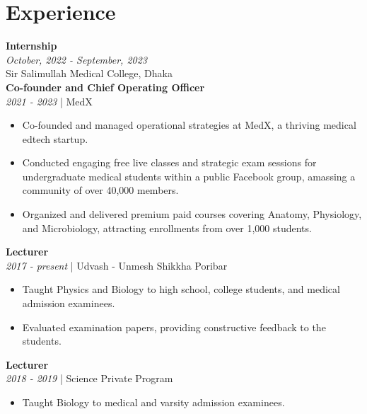 \documentclass[a4paper,11pt]{article}
\newcommand{\resumeentry}[2]{
    \textbf{#1} \\
    \textit{#2}
}
\begin{document}
\begin{minipage}[t][6cm]{\textwidth}
\section*{Experience}
\resumeentry{Internship}{October, 2022 - September, 2023}\\ Sir Salimullah Medical College, Dhaka \vspace{0.2cm} \\
\resumeentry{Co-founder and Chief Operating Officer}{2021 - 2023} | MedX
\begin{itemize}[left=0em, itemsep=0pt, parsep=0pt]
  \item Co-founded and managed operational strategies at MedX, a thriving medical edtech startup.
  \item Conducted engaging free live classes and strategic exam sessions for undergraduate medical students within a public Facebook group, amassing a community of over 40,000 members.
  \item Organized and delivered premium paid courses covering Anatomy, Physiology, and Microbiology, attracting enrollments from over 1,000 students.
\end{itemize}
\resumeentry{Lecturer}{2017 - present} | Udvash - Unmesh Shikkha Poribar
\begin{itemize}[left=0em, itemsep=10pt, parsep=-10pt]
  \item Taught Physics and Biology to high school, college students, and medical admission examinees.
  \item Evaluated examination papers, providing constructive feedback to the students.
\end{itemize}
\resumeentry{Lecturer}{2018 - 2019} | Science Private Program
\begin{itemize}[left=0em, itemsep=0pt, parsep=-10pt]
  \item Taught Biology to medical and varsity admission examinees.
\end{itemize}
\end{minipage}
\end{document}
